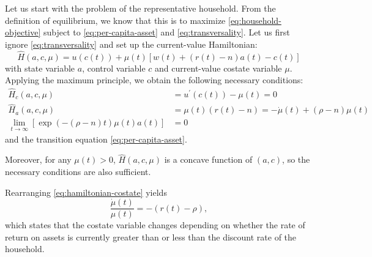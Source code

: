 \documentclass[\topdir/lecture\_notes.tex]{subfiles}
\begin{document}
Let us start with the problem of the representative household.
From the definition of equilibrium, we know that this is to maximize \eqref{eq:household-objective} subject to \eqref{eq:per-capita-asset} and \eqref{eq:transversality}.
Let us first ignore \eqref{eq:transversality} and set up the current-value Hamiltonian:
\[
  \hat{H}(a, c, \mu)=u(c(t))+\mu(t)[w(t)+(r(t)-n) a(t)-c(t)]
\]
with state variable \(a\), control variable \(c\) and current-value costate variable \(\mu\).
Applying the maximum principle, we obtain the following necessary conditions:
\begin{align}
  \hat{H}_{c}(a, c, \mu)                                      & =u^{\prime}(c(t))-\mu(t)=0                    &  & \label{eq:hamiltonian-foc-c}          \\
  \hat{H}_{a}(a, c, \mu)                                      & =\mu(t)(r(t)-n)=-\dot{\mu}(t)+(\rho-n) \mu(t) &  & \label{eq:hamiltonian-costate}        \\
  \lim _{t \rightarrow \infty}[\exp(-(\rho-n) t) \mu(t) a(t)] & =0                                            &  & \nonumber
\end{align}
and the transition equation \eqref{eq:per-capita-asset}.

Moreover, for any \(\mu(t)>0\), \(\hat{H}(a, c, \mu)\) is a concave function of \((a, c)\), so the necessary conditions are also sufficient.

Rearranging \eqref{eq:hamiltonian-costate} yields
\begin{equation}
  \frac{\dot{\mu}(t)}{\mu(t)}=-(r(t)-\rho),
  \label{eq:mu-dynamics}
\end{equation}
which states that the costate variable changes depending on whether the rate of return on assets is currently greater than or less than the discount rate of the household.
\end{document}
